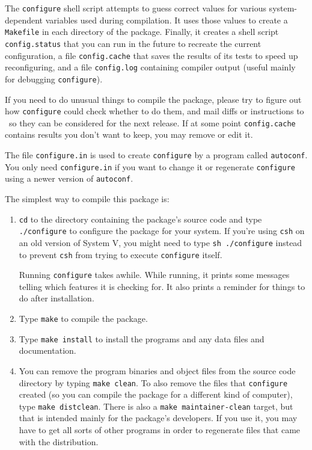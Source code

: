 \begin{appendix}
   The \verb+configure+ shell script attempts to guess correct values for
various system-dependent variables used during compilation.  It uses
those values to create a \verb+Makefile+ in each directory of the package.
Finally, it creates a shell script \verb+config.status+ that
you can run in the future to recreate the current configuration, a file
\verb+config.cache+ that saves the results of its tests to speed up
reconfiguring, and a file \verb+config.log+ containing compiler output
(useful mainly for debugging \verb+configure+).

   If you need to do unusual things to compile the package, please try
to figure out how \verb+configure+ could check whether to do them, and mail
diffs or instructions to \bugs\ so they can
be considered for the next release.  If at some point \verb+config.cache+
contains results you don't want to keep, you may remove or edit it.

   The file \verb+configure.in+ is used to create \verb+configure+ by a program
called \verb+autoconf+.  You only need \verb+configure.in+ 
if you want to change it or regenerate \verb+configure+ using a newer 
version of \verb+autoconf+.

The simplest way to compile this package is:
\begin{enumerate}
\item \verb+cd+ to the directory containing the package's source code and type
     \verb+./configure+ to configure the package for your system.  If you're
     using \verb+csh+ on an old version of System V, you might need to type
     \verb+sh ./configure+ instead to prevent \verb+csh+ from trying to execute
     \verb+configure+ itself.

     Running \verb+configure+ takes awhile.  While running, it prints some
     messages telling which features it is checking for. It also prints
     a reminder for things to do after installation.

\item Type \verb+make+ to compile the package.

\item Type \verb+make install+ to install the programs and any data files and
     documentation.

\item You can remove the program binaries and object files from the
     source code directory by typing \verb+make clean+.  To also remove the
     files that \verb+configure+ created (so you can compile the package for
     a different kind of computer), type \verb+make distclean+.  There is
     also a \verb+make maintainer-clean+ target, but that is intended mainly
     for the package's developers.  If you use it, you may have to get
     all sorts of other programs in order to regenerate files that came
     with the distribution.


\end{enumerate}
\end{appendix}

